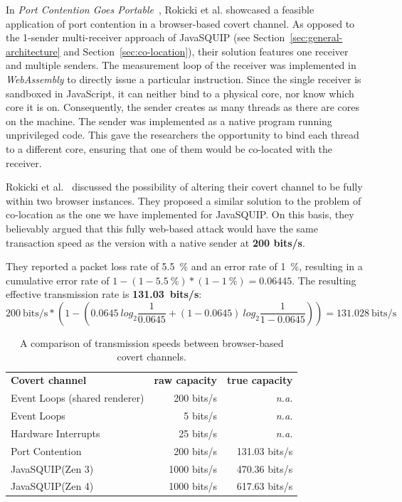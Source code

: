 \documentclass[11pt,
  titlepage=false,
  parskip=half,      %
]{scrreprt}
\begin{document}
In \textit{Port Contention Goes Portable}~\cite{Rokicki2022webport},
Rokicki et al. showcased a feasible application of port contention in a browser-based covert channel.
As opposed to the 1-sender multi-receiver approach of JavaSQUIP (see Section~\ref{sec:general-architecture} and Section~\ref{sec:co-location}),
their solution features one receiver and multiple senders.
The measurement loop of the receiver was implemented in \textit{WebAssembly} to directly issue a particular instruction.
Since the single receiver is sandboxed in JavaScript, it can neither bind to a physical core, nor know which core it is on.
Consequently, the sender creates as many threads as there are cores on the machine.
The sender was implemented as a native program running unprivileged code.
This gave the researchers the opportunity to bind each thread to a different core,
ensuring that one of them would be co-located with the receiver.

Rokicki et al.~\cite{Rokicki2022webport} discussed the possibility of altering their covert channel to be fully within two browser instances.
They proposed a similar solution to the problem of co-location as the one we have implemented for JavaSQUIP.
On this basis, they believably argued that this fully web-based attack would have the same transaction speed as the version
with a native sender at \textbf{200 bits/s}.

They reported a packet loss rate of 5.5~\% and an error rate of 1~\%, resulting in a cumulative error rate of $1 - (1 - 5.5~\%) * (1 - 1~\%) = 0.06445$.
The resulting effective transmission rate is \textbf{131.03~bits/s}:
\[200~\text{bits/s} * \left( 1 - \left( 0.0645~log_2 \frac{1}{0.0645} + (1 - 0.0645)~log_2 \frac{1}{1 - 0.0645} \right) \right) = 131.028~\text{bits/s}\]




\begin{table}[t]
\centering
\begin{tabular}{ |l|r|r| }
\hline
\textbf{Covert channel} & \textbf{raw capacity} & \textbf{true capacity} \\
\Xhline{2pt}
Event Loops (shared renderer) & 200 bits/s & \textit{n.a.} \\
\hline
Event Loops & 5 bits/s & \textit{n.a.} \\
\hline
Hardware Interrupts & 25 bits/s & \textit{n.a.} \\
\hline
Port Contention & 200 bits/s & 131.03 bits/s \\
\hline
JavaSQUIP(Zen 3) & 1000 bits/s & 470.36 bits/s\\
\hline
JavaSQUIP(Zen 4) & 1000 bits/s & 617.63 bits/s\\
\hline
\end{tabular}

\caption{A comparison of transmission speeds between browser-based covert channels.}
\label{tab:speedcomparison}
\end{table}
\end{document}
